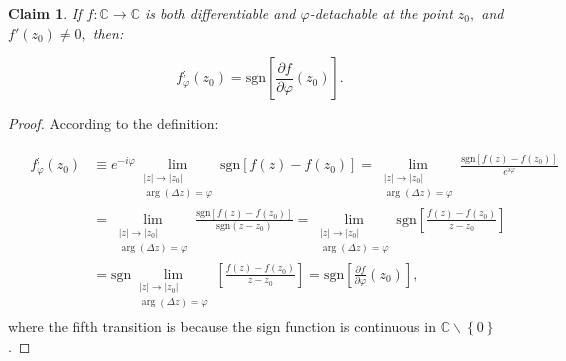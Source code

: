 \documentclass[11pt]{book}
\newtheorem{clm}[thm]{Claim}
\begin{document}
\begin{clm}If $f:\mathbb{C}\longrightarrow\mathbb{C}$ is both differentiable and $\varphi$-detachable at the point $z_{0},$ and $f'\left(z_{0}\right)\neq0,$ then:

$$f_{\varphi}^{;}\left(z_{0}\right)=\text{sgn}\left[\frac{\partial f}{\partial\varphi}\left(z_{0}\right)\right].$$
\end{clm}
\begin{proof}According to the definition:

\begin{align}
&\begin{aligned}
f_{\varphi}^{;}\left(z_{0}\right) &\equiv e^{-i\varphi}\underset{\begin{array}{c}
\left|z\right|\to\left|z_{0}\right|\\
\arg\left(\Delta z\right)=\varphi
\end{array}}{\lim}\text{sgn}\left[f\left(z\right)-f\left(z_{0}\right)\right]=\underset{\begin{array}{c}
\left|z\right|\to\left|z_{0}\right|\\
\arg\left(\Delta z\right)=\varphi
\end{array}}{\lim}\frac{\text{sgn}\left[f\left(z\right)-f\left(z_{0}\right)\right]}{e^{i\varphi}}\\
&=\underset{\begin{array}{c}
\left|z\right|\to\left|z_{0}\right|\\
\arg\left(\Delta z\right)=\varphi
\end{array}}{\lim}\frac{\text{sgn}\left[f\left(z\right)-f\left(z_{0}\right)\right]}{\text{sgn}\left(z-z_{0}\right)}
=\underset{\begin{array}{c}
\left|z\right|\to\left|z_{0}\right|\\
\arg\left(\Delta z\right)=\varphi
\end{array}}{\lim}\text{sgn}\left[\frac{f\left(z\right)-f\left(z_{0}\right)}{z-z_{0}}\right] \\
&=\text{sgn}\underset{\begin{array}{c}
\left|z\right|\to\left|z_{0}\right|\\
\arg\left(\Delta z\right)=\varphi
\end{array}}{\lim}\left[\frac{f\left(z\right)-f\left(z_{0}\right)}{z-z_{0}}\right]=\text{sgn}\left[\frac{\partial f}{\partial\varphi}\left(z_{0}\right)\right],
\end{aligned}
\end{align}
where the fifth transition is because the sign function is continuous in $\mathbb{C}\backslash\left\{ 0\right\}$.
\end{proof}
\end{document}
